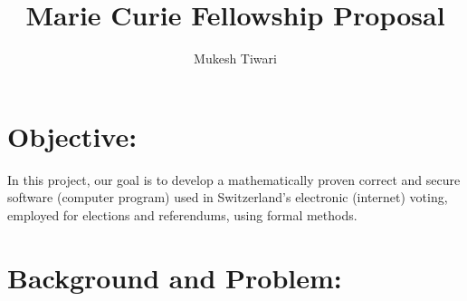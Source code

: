 \documentclass[a4paper]{article}
\title{Marie Curie Fellowship Proposal}
\author{Mukesh Tiwari}
\date{}
\begin{document}
\fontsize{11}{15}
\selectfont
\maketitle




\section{Objective:} 

In this project, our goal is to develop a mathematically proven correct 
and secure software (computer program) used in Switzerland's  electronic (internet)
voting, employed for elections  and referendums, using formal methods.

\section{Background and Problem:}
\end{document}
